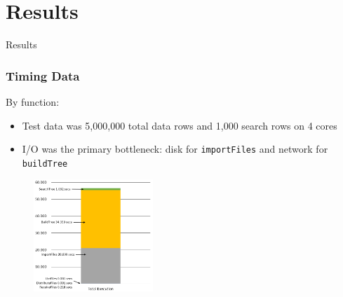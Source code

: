 \documentclass[usernames,dvipsnames]{beamer}
\begin{document}
\section{Results}

\begin{frame}	
	\begin{Huge}
		\begin{center}
			Results
		\end{center}
	\end{Huge}
\end{frame}


\begin{frame}[fragile]	
	\frametitle{Timing Data}
	
        	\begin{block}{By function:}
        		\begin{itemize}
        			\item Test data was 5,000,000 total data rows and 1,000 search rows on 4 cores
        			\item I/O was the primary bottleneck: disk for \texttt{importFiles} and network for \texttt{buildTree}
        		\end{itemize}
        	\end{block}
        	\begin{figure}
            \centering
	        \includegraphics[width=0.40\textwidth]{images/Runtime3.png}
	        \end{figure}
\end{frame}


\end{document}
